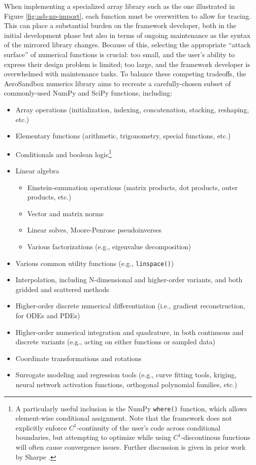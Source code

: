 When implementing a specialized array library such as the one illustrated in Figure \ref{fig:asb-np-import}, each function must be overwritten to allow for tracing. This can place a substantial burden on the framework developer, both in the initial development phase but also in terms of ongoing maintenance as the syntax of the mirrored library changes. Because of this, selecting the appropriate ``attack surface'' of numerical functions is crucial: too small, and the user's ability to express their design problem is limited; too large, and the framework developer is overwhelmed with maintenance tasks. To balance these competing tradeoffs, the AeroSandbox numerics library aims to recreate a carefully-chosen subset of commonly-used NumPy and SciPy functions, including:

\begin{itemize}[noitemsep]
    \item Array operations (initialization, indexing, concatenation, stacking, reshaping, etc.)
    \item Elementary functions (arithmetic, trigonometry, special functions, etc.)
    \item Conditionals and boolean logic\footnote{A particularly useful inclusion is the NumPy \texttt{where()} function, which allows element-wise conditional assignment. Note that the framework does not explicitly enforce $C^1$-continuity of the user's code across conditional boundaries, but attempting to optimize while using $C^1$-discontinous functions will often cause convergence issues. Further discussion is given in prior work by Sharpe \cite{sharpe_aerosandbox_2021}.}
    \item Linear algebra
    \begin{itemize}[noitemsep]
        \item Einstein-summation operations (matrix products, dot products, outer products, etc.)
        \item Vector and matrix norms
        \item Linear solves, Moore-Penrose pseudoinverses
        \item Various factorizations (e.g., eigenvalue decomposition)
    \end{itemize}
    \item Various common utility functions (e.g., \texttt{linspace()})
    \item Interpolation, including N-dimensional and higher-order variants, and both gridded and scattered methods
    \item Higher-order discrete numerical differentiation (i.e., gradient reconstruction, for ODEs and PDEs)
    \item Higher-order numerical integration and quadrature, in both continuous and discrete variants (e.g., acting on either functions or sampled data)
    \item Coordinate transformations and rotations
    \item Surrogate modeling and regression tools (e.g., curve fitting tools, kriging, neural network activation functions, orthogonal polynomial families, etc.)
\end{itemize}

